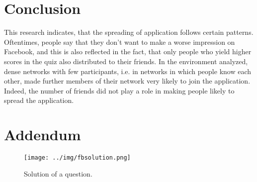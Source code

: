 \documentclass[preprint,12pt]{elsarticle}
\begin{document}
\section{Conclusion}
\label{sec:conclusion}
This research indicates, that the spreading of application follows
certain patterns. Oftentimes, people say that they don't want to
make a worse impression on Facebook, and this is also reflected in the
fact, that only people who yield higher scores in the quiz also
distributed to their friends. In the environment analyzed, dense
networks with few participants, i.e. in networks in which people know
each other, made  further members of their network very likely to join
the application. Indeed, the number of friends did not play a role in
making people likely to spread the application.





















\newpage
\section{Addendum}
\label{sec:addendum}
\begin{figure}
  \texttt{[image: ../img/fbsolution.png]}
  \caption{Solution of a question.}
\label{fig:solution}
\end{figure}
\end{document}

